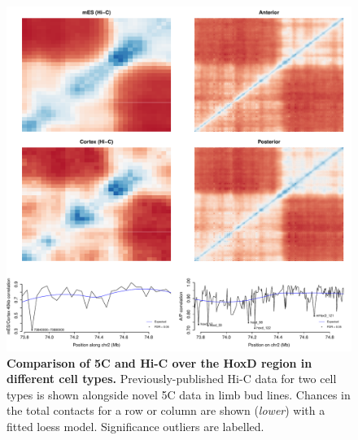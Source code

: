 \documentclass[a4paper,11pt,oneside]{book}
\begin{document}
\begin{figure}
\begin{center} 
\includegraphics[width=\textwidth]{figs/5chic.pdf}
\captionsetup{width=\textwidth} 
\caption[Comparison of 5C and Hi-C over the HoxD region in different cell types.]{ {\bf Comparison of 5C and Hi-C over the HoxD region in different cell types. }
Previously-published Hi-C data\cite{Dixon2012} for two cell types is shown alongside novel 5C data in limb bud lines. Chances in the total contacts for a row or column are shown (\emph{lower}) with a fitted loess model. Significance outliers are labelled.
}\label{fig:5cdiff}
\end{center} 
\end{figure} 


\ifstandalone
\begin{small}

\end{small}
\fi
\end{document}

